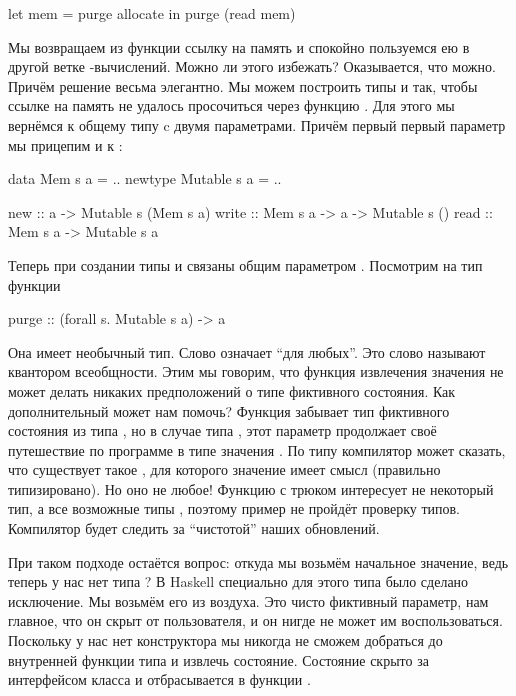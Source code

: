 \begin{code}
let mem = purge allocate
in  purge (read mem)
\end{code}

Мы возвращаем из функции  ссылку на память и спокойно
пользуемся ею в другой ветке -вычислений. Можно ли этого
избежать? Оказывается, что можно. Причём решение весьма элегантно. Мы
можем построить типы  и  так, чтобы ссылке на память
не удалось просочиться через функцию . Для этого мы вернёмся к
общему типу  c двумя параметрами. Причём первый первый
параметр мы прицепим и к :


\begin{code}
data    Mem     s a = ..
newtype Mutable s a = ..

new     :: a -> Mutable s (Mem s a)
write   :: Mem s a -> a -> Mutable s ()
read    :: Mem s a -> Mutable s a
\end{code}

Теперь при создании типы  и  связаны общим
параметром . Посмотрим на тип функции 


\begin{code}
purge :: (forall s. Mutable s a) -> a
\end{code}

Она имеет необычный тип. Слово  означает ``для любых''. Это
слово называют квантором всеобщности. Этим мы говорим, что функция
извлечения значения не может делать никаких предположений о типе
фиктивного состояния. Как дополнительный  может нам помочь?
Функция  забывает тип фиктивного состояния  из типа
, но в случае типа , этот параметр продолжает своё
путешествие по программе в типе значения . По типу
 компилятор может сказать, что существует такое , для
которого значение  имеет смысл (правильно типизировано). Но оно не
любое! Функцию  с трюком интересует не некоторый тип, а все
возможные типы , поэтому пример не пройдёт проверку типов.
Компилятор будет следить за ``чистотой'' наших обновлений.

При таком подходе остаётся вопрос: откуда мы возьмём начальное значение,
ведь теперь у нас нет типа ? В Haskell специально для
этого типа было сделано исключение. Мы возьмём его из воздуха. Это чисто
фиктивный параметр, нам главное, что он скрыт от пользователя, и он
нигде не может им воспользоваться. Поскольку у нас нет конструктора
 мы никогда не сможем добраться до внутренней функции типа
 и извлечь состояние. Состояние скрыто за интерфейсом класса
 и отбрасывается в функции .

